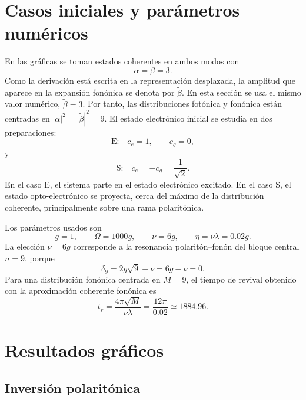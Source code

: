 \documentclass[11pt]{article}
\begin{document}
\section{Casos iniciales y par\'ametros num\'ericos}

En las gr\'aficas se toman estados coherentes en ambos modos con
\begin{equation}
  \boxed{
  \alpha=\beta=3.
  }
\end{equation}
Como la derivaci\'on est\'a escrita en la representaci\'on desplazada, la
amplitud que aparece en la expansi\'on fon\'onica se denota por
$\tilde\beta$. En esta secci\'on se usa el mismo valor num\'erico,
$\tilde\beta=3$.
Por tanto, las distribuciones fot\'onica y fon\'onica est\'an centradas en
$|\alpha|^2=|\tilde\beta|^2=9$. El estado electr\'onico inicial se estudia en
dos preparaciones:
\begin{equation}
  \boxed{
  \text{E:}\quad c_e=1,\qquad c_g=0,
  }
\end{equation}
y
\begin{equation}
  \boxed{
  \text{S:}\quad c_e=-c_g=\frac{1}{\sqrt2}.
  }
\end{equation}
En el caso E, el sistema parte en el estado electr\'onico excitado. En el caso
S, el estado opto-electr\'onico se proyecta, cerca del m\'aximo de la
distribuci\'on coherente, principalmente sobre una rama polarit\'onica.

Los par\'ametros usados son
\begin{equation}
  \boxed{
  g=1,
  \qquad
  \Omega=1000g,
  \qquad
  \nu=6g,
  \qquad
  \eta=\nu\lambda=0.02g.
  }
\end{equation}
La elecci\'on $\nu=6g$ corresponde a la resonancia polarit\'on--fon\'on del
bloque central $n=9$, porque
\begin{equation}
  \delta_9=2g\sqrt9-\nu=6g-\nu=0.
\end{equation}
Para una distribuci\'on fon\'onica centrada en $M=9$, el tiempo de revival
obtenido con la aproximaci\'on coherente fon\'onica es
\begin{equation}
  \boxed{
  t_r
  =
  \frac{4\pi\sqrt M}{\nu\lambda}
  =
  \frac{12\pi}{0.02}
  \simeq
  1884.96.
  }
\end{equation}

\section{Resultados gr\'aficos}

\subsection{Inversi\'on polarit\'onica}
\end{document}
